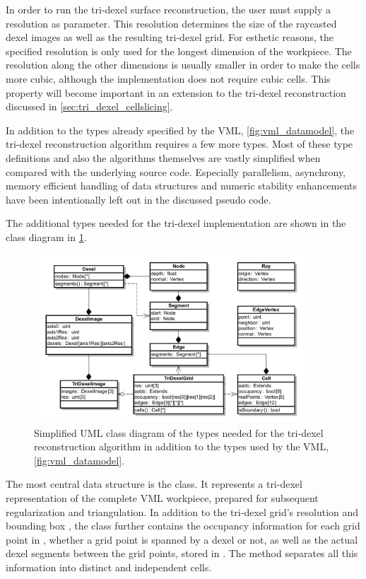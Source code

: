 In order to run the tri-dexel surface reconstruction, the user must supply a resolution as parameter.
This resolution determines the size of the raycasted dexel images as well as the resulting tri-dexel grid.
For esthetic reasons, the specified resolution is only used for the longest dimension of the workpiece.
The resolution along the other dimensions is usually smaller in order to make the cells more cubic, although the implementation does not require cubic cells.
This property will become important in an extension to the tri-dexel reconstruction discussed in \cref{sec:tri_dexel_cellslicing}.


In addition to the types already specified by the VML, \cf \cref{fig:vml_datamodel}, the tri-dexel reconstruction algorithm requires a few more types.
Most of these type definitions and also the algorithms themselves are vastly simplified when compared with the underlying source code.
Especially parallelism, asynchrony, memory efficient handling of data structures and numeric stability enhancements have been intentionally left out in the discussed pseudo code.


The additional types needed for the tri-dexel implementation are shown in the class diagram in \cref{fig:tri_dexel_datamodel}.
%
\begin{figure}
	\centering
	\includegraphics[width=0.9\textwidth]{images/tri_dexel_datamodel}
	\caption[Tri-dexel UML class diagram]{
		Simplified UML class diagram of the types needed for the tri-dexel reconstruction algorithm in addition to the types used by the VML, \cf \cref{fig:vml_datamodel}.
	}
	\label{fig:tri_dexel_datamodel}
\end{figure}
%
The most central data structure is the  class.
It represents a tri-dexel representation of the complete VML workpiece, prepared for subsequent regularization and triangulation.
In addition to the tri-dexel grid's resolution  and bounding box , the  class further contains the occupancy information for each grid point in , \ie whether a grid point is spanned by a dexel or not, as well as the actual dexel segments between the grid points, stored in .
The  method separates all this information into distinct and independent cells.

